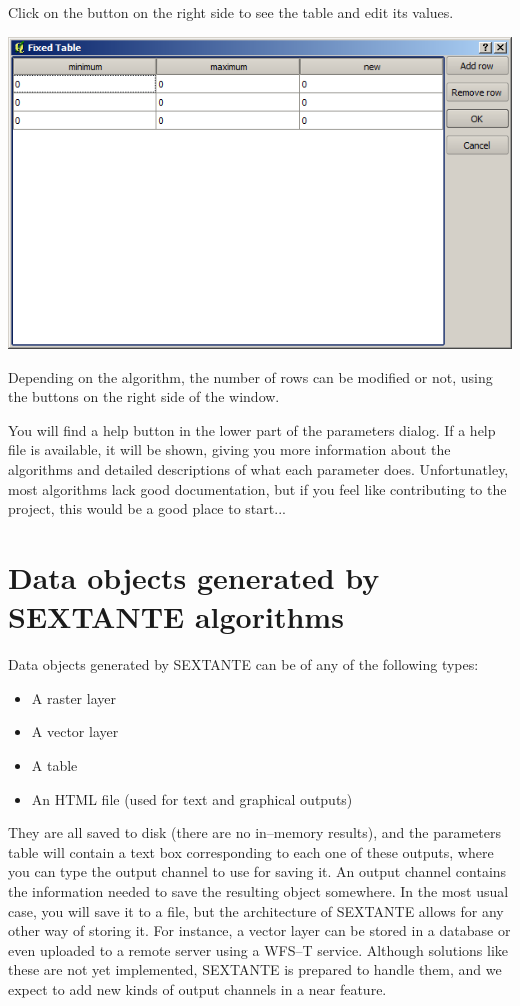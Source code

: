\begin{itemize}
	Click on the button on the right side to see the table and edit its values. 
\begin{center}
\includegraphics[width=.9\columnwidth]{fixed_table.png}
\end{center}

Depending on the algorithm, the number of rows can be modified or not, using the buttons on the right side of the window.

You will find a help button in the lower part of the parameters dialog. If a help file is available, it will be shown, giving you more information about the algorithms and detailed descriptions of what each parameter does. Unfortunatley, most algorithms lack good documentation, but if you feel like contributing to the project, this would be a good place to start...

\end{itemize}

\section{Data objects generated by SEXTANTE algorithms}

Data objects generated by SEXTANTE can be of any of the following types:

\begin{itemize}
 \item A raster layer
\item A vector layer
\item A table
\item An HTML file (used for text and graphical outputs)
\end{itemize}

They are all saved to disk (there are no in--memory results), and the parameters table will contain a text box corresponding to each one of these outputs, where you can type the output channel to use for saving it. An output channel contains the information needed to save the resulting object somewhere. In the most usual case, you will save it to a file, but the architecture of SEXTANTE allows for any other way of storing it. For instance, a vector layer can be stored in a database or even uploaded to a remote server using a WFS--T service. Although solutions like these are not yet implemented, SEXTANTE is prepared to handle them, and we expect to add new kinds of output channels in a near feature.

